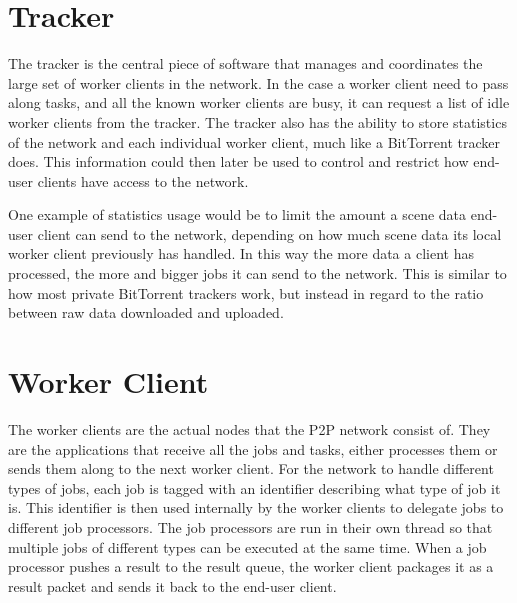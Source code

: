\section{Tracker}
The tracker is the central piece of software that manages and coordinates the large set of worker clients in the network.
In the case a worker client need to pass along tasks, and all the known worker clients are busy, it can request a list of idle worker clients from the tracker. The tracker also has the ability to store statistics of the network and each individual worker client, much like a BitTorrent tracker does. This information could then later be used to control and restrict how end-user clients have access to the network. 

One example of statistics usage would be to limit the amount a scene data end-user client can send to the network, depending on how much scene data its local worker client previously has handled. In this way the more data a client has processed, the more and bigger jobs it can send to the network. This is similar to how most private BitTorrent trackers work, but instead in regard to the ratio between raw data downloaded and uploaded.



\section{Worker Client}
The worker clients are the actual nodes that the P2P network consist of. They are the applications that receive all the jobs and tasks, either processes them or sends them along to the next worker client. For the network to handle different types of jobs, each job is tagged with an identifier describing what type of job it is. This identifier is then used internally by the worker clients to delegate jobs to different job processors. The job processors are run in their own thread so that multiple jobs of different types can be executed at the same time. When a job processor pushes a result to the result queue, the worker client packages it as a result packet and sends it back to the end-user client.

